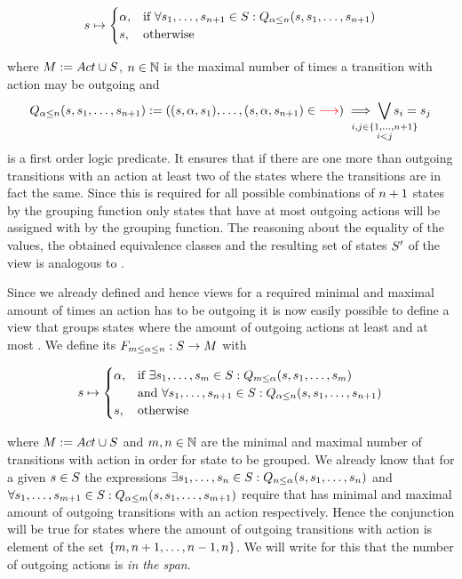 \documentclass[preview]{standalone}
\begin{document}
\[
\state \mapsto
\begin{cases}
	\action,				& \text{if } \forall \state_1, \dots, \state_{\numoutact+1} \in \states: \predmaxoutact \\
	\state,          	& \text{otherwise}
\end{cases}
\]

where $\imggrp := \setoutact$, $\numoutact \in \natnums$ is the maximal number of times a transition with action \action may be outgoing and 
\[
	\predmaxoutact := ((\state, \action, \state_1), \dots, (\state, \action, \state_{\numoutact+1}) \in \redcomment{\transitionrel}) \implies \bigvee_{\mathclap{\substack{i,j \in \{1,\dots, \numoutact+1\} \\ i < j}}} \state_i = \state_j
\]
is a first order logic predicate. It ensures that if there are one more than \numoutact outgoing transitions with an action \action at least two of the states where the transitions  are in fact the same. Since this is required for all possible combinations of $\numoutact + 1$ states by the grouping function only states that have at most \numoutact outgoing actions will be assigned with \action by the grouping function. The reasoning about the equality of the \grpfctN values, the obtained equivalence classes and the resulting set of states $\states'$ of the view is analogous to \viewminoutaction.

Since we already defined \grpfctsN and hence views for a required minimal and maximal amount of times an action has to be outgoing it is now easily possible to define a view that groups states where the amount of outgoing actions at least \numoutact and at most \numoutactb. We define its \grpfctN $\gfctspanoutaction : \states \to \arbset$ with

\[
\state \mapsto
\begin{cases}
	\action,				& \text{if } \exists \state_1, \dots, \state_\numoutactb \in \states: \predminoutact[\numoutactb] \\ &\text{and } \forall \state_1, \dots, \state_{\numoutact+1} \in \states: \predmaxoutact \\
	\state,          	& \text{otherwise}
\end{cases}
\]

where $\imggrp := \setoutact$ and $\numoutactb, \numoutact \in \natnums$ are the minimal and maximal number of transitions with action \action in order for state to be grouped.
We already know that for a given $\state \in \states$ the expressions $\exists \state_1, \dots, \state_\numoutact \in \states: \predminoutact$ and $\forall \state_1, \dots, \state_{\numoutactb+1} \in \states: \predmaxoutact[\numoutactb]$ require that \state has minimal and maximal amount of outgoing transitions with an action \action respectively. Hence the conjunction will be true for states where the amount of outgoing transitions with action \action is element of the set $\{\numoutactb, \numoutact+1, \dots, \numoutact-1, \numoutact\}$. We will write for this that the number of outgoing actions is \emph{in the span}.
\end{document}

